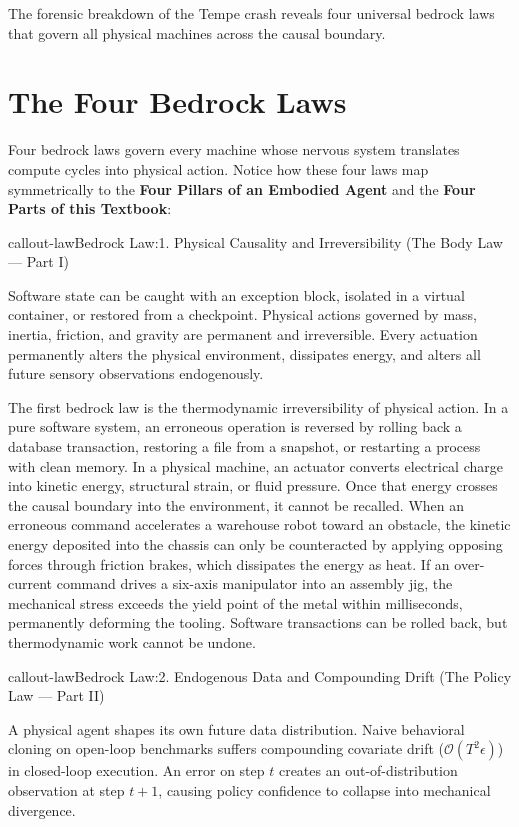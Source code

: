 \documentclass[
  10pt,
  letterpaper,
  twoside,
  openright,
  numbers=noenddot,
  headings=standardclasses
]{scrbook}
\begin{document}
The forensic breakdown of the Tempe crash reveals four universal bedrock
laws that govern all physical machines across the causal boundary.

\section{The Four Bedrock Laws}\label{sec-boundary-1-7}

Four bedrock laws govern every machine whose nervous system translates
compute cycles into physical action. Notice how these four laws map
symmetrically to the \textbf{Four Pillars of an Embodied Agent} and the
\textbf{Four Parts of this Textbook}:

\protect{}\label{callout-lawux2a-1.6}
\begin{fbxSimple}{callout-law}{Bedrock Law:}{1. Physical Causality and Irreversibility (The Body Law — Part I)}
\label{callout-law*-1.6}

Software state can be caught with an exception block, isolated in a
virtual container, or restored from a checkpoint. Physical actions
governed by mass, inertia, friction, and gravity are permanent and
irreversible. Every actuation permanently alters the physical
environment, dissipates energy, and alters all future sensory
observations endogenously.

\end{fbxSimple}

The first bedrock law is the thermodynamic irreversibility of physical
action. In a pure software system, an erroneous operation is reversed by
rolling back a database transaction, restoring a file from a snapshot,
or restarting a process with clean memory. In a physical machine, an
actuator converts electrical charge into kinetic energy, structural
strain, or fluid pressure. Once that energy crosses the causal boundary
into the environment, it cannot be recalled. When an erroneous command
accelerates a warehouse robot toward an obstacle, the kinetic energy
deposited into the chassis can only be counteracted by applying opposing
forces through friction brakes, which dissipates the energy as heat. If
an over-current command drives a six-axis manipulator into an assembly
jig, the mechanical stress exceeds the yield point of the metal within
milliseconds, permanently deforming the tooling. Software transactions
can be rolled back, but thermodynamic work cannot be undone.

\protect{}\label{callout-lawux2a-1.7}
\begin{fbxSimple}{callout-law}{Bedrock Law:}{2. Endogenous Data and Compounding Drift (The Policy Law — Part II)}
\label{callout-law*-1.7}

A physical agent shapes its own future data distribution. Naive
behavioral cloning on open-loop benchmarks suffers compounding covariate
drift (\(\mathcal{O}(T^2 \epsilon)\)) in closed-loop execution. An error
on step \(t\) creates an out-of-distribution observation at step
\(t+1\), causing policy confidence to collapse into mechanical
divergence.

\end{fbxSimple}
\end{document}
